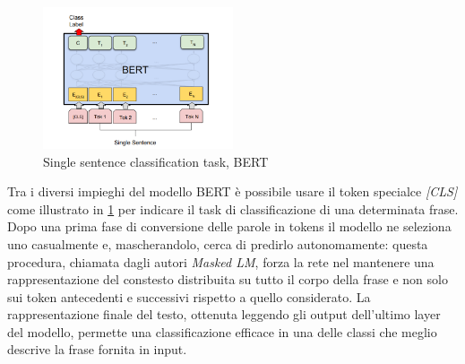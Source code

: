     \begin{figure}[h!]
        \centering
        \includegraphics[width=0.5\textwidth]{pics/oth/bert for classification.png}
        \caption{Single sentence classification task, BERT}
        \label{fig:bert-classification}
    \end{figure}


    Tra i diversi impieghi del modello BERT è possibile usare il token specialce \textit{[CLS]} come illustrato in \ref{fig:bert-classification} per indicare il task di classificazione di una determinata frase. Dopo una prima fase di conversione delle parole in tokens il modello ne seleziona uno casualmente e, mascherandolo, cerca di predirlo autonomamente: questa procedura, chiamata dagli autori \textit{Masked LM}, forza la rete nel mantenere una rappresentazione del constesto distribuita su tutto il corpo della frase e non solo sui token antecedenti e successivi rispetto a quello considerato. La rappresentazione finale del testo, ottenuta leggendo gli output dell'ultimo layer del modello, permette una classificazione efficace in una delle classi che meglio descrive la frase fornita in input.

